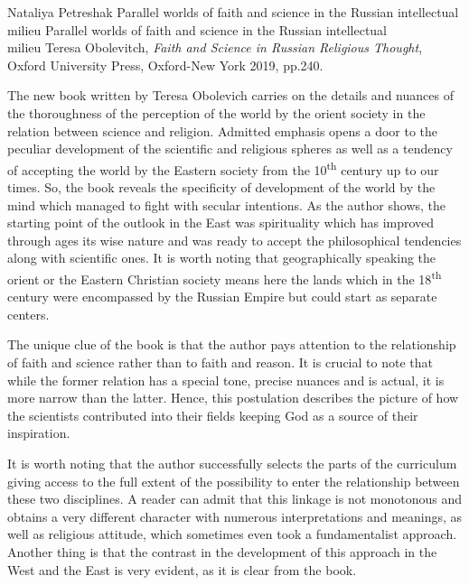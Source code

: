 \begin{recengenv}{Nataliya Petreshak}
	{Parallel worlds of faith and science in the Russian intellectual milieu}
	{Parallel worlds of faith and science in the Russian intellectual\\milieu}
	{Teresa Obolevitch, \textit{Faith and Science in Russian Religious Thought}, Oxford University Press, Oxford-New York 2019,
		pp.240.}
 





The new book written by Teresa Obolevich carries on the details and nuances of the thoroughness of the
perception of the world by the orient society in the relation between science and religion. Admitted emphasis opens a door
to the peculiar development of the scientific and religious spheres as well as a tendency of accepting the world by the
Eastern society from the 10\textsuperscript{th} century up to our times. So, the book reveals
the specificity of development of the world by the mind which managed to fight with secular intentions. As the author
shows, the starting point of the outlook in the East was spirituality which has improved through ages its wise
nature and was ready to accept the philosophical tendencies along with scientific ones. It is worth noting
that geographically speaking
the orient or the Eastern Christian society means here the lands which in the
18\textsuperscript{th} century were encompassed by the Russian Empire but could start as separate centers.


The unique clue of the book is that the author pays attention to the relationship of faith and science rather than to faith and
reason. It is crucial to note that while the former relation has a special tone, precise nuances and is actual,
it is more narrow than the latter. Hence, this postulation describes the picture of how the scientists
contributed into their fields keeping God as a source of their inspiration.


It is worth noting that the author successfully selects the parts of the curriculum giving access to the full extent
of the possibility to enter the relationship between these two disciplines. A reader can admit that this linkage is not
monotonous and obtains a very different character with numerous interpretations and meanings, as well as religious
attitude, which sometimes even took a fundamentalist approach. Another thing is that
the contrast in the development of this approach in the West and the East
is very evident, as it is clear from the book.



\end{recengenv}

